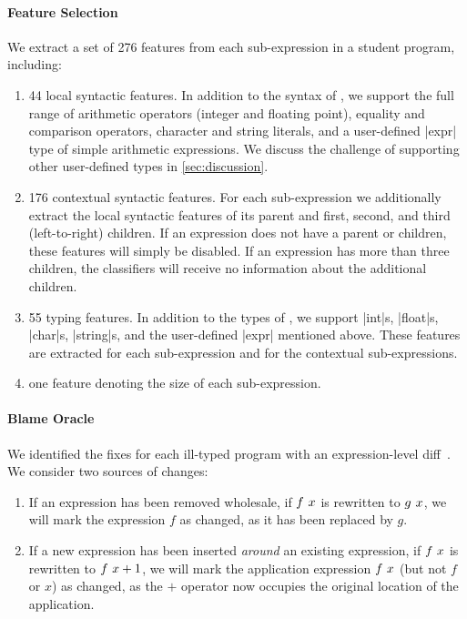 \paragraph{Feature Selection}
We extract a set of 276 features from each sub-expression in a student
program, including:
%
\begin{enumerate}
\item 44 local syntactic features. In addition to the syntax of \lang,
  we support the full range of arithmetic operators (integer and
  floating point), equality and comparison operators, character and
  string literals, and a user-defined |expr| type of simple arithmetic
  expressions. We discuss the challenge of supporting other
  user-defined types in \autoref{sec:discussion}.
\item 176 contextual syntactic features. For each sub-expression we
  additionally extract the local syntactic features of its parent and
  first, second, and third (left-to-right) children. If an expression
  does not have a parent or children, these features will simply be
  disabled. If an expression has more than three children, the
  classifiers will receive no information about the additional
  children.
\item 55 typing features. In addition to the types of \lang, we support
  |int|s, |float|s, |char|s, |string|s, and the user-defined |expr|
  mentioned above. These features are extracted for each sub-expression
  and for the contextual sub-expressions.
\item one feature denoting the size of each sub-expression.
\end{enumerate}

\paragraph{Blame Oracle}
We identified the fixes for each ill-typed program with an
expression-level diff~\citep{Lempsink2009-xf}.
%
We consider two sources of changes:
%
\begin{enumerate}
\item If an expression has been removed wholesale, \eg if $f\ x$
  is rewritten to $g\ x$, we will mark the expression $f$ as
  changed, as it has been replaced by $g$.
\item If a new expression has been inserted \emph{around} an existing
  expression, \eg if $f\ x$ is rewritten to
  $f\ x + 1$, we will mark the application expression
  $f\ x$ (but not $f$ or $x$) as changed, as the $+$ operator now
  occupies the original location of the application.
\end{enumerate}

